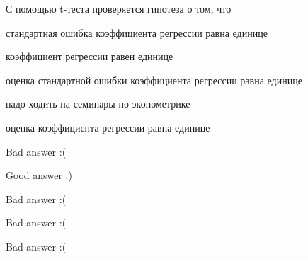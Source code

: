 
\begin{question}
С помощью t-теста проверяется гипотеза о том, что
\begin{answerlist}
  \item стандартная ошибка коэффициента регрессии равна единице
  \item коэффициент регрессии равен единице
  \item оценка стандартной ошибки коэффициента регрессии равна единице
  \item надо ходить на семинары по эконометрике
  \item оценка коэффициента регрессии равна единице
\end{answerlist}
\end{question}

\begin{solution}
\begin{answerlist}
  \item Bad answer :(
  \item Good answer :)
  \item Bad answer :(
  \item Bad answer :(
  \item Bad answer :(
\end{answerlist}
\end{solution}

